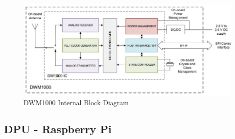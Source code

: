 \medskip
\begin{figure}[H]
\centering
    \includegraphics[scale=0.65]{./images/dwm1000_bd.jpg}
    \caption{DWM1000 Internal Block Diagram}
    \label{dwm1000_bd}
\end{figure}

\pagebreak
\subsection{DPU - Raspberry Pi}